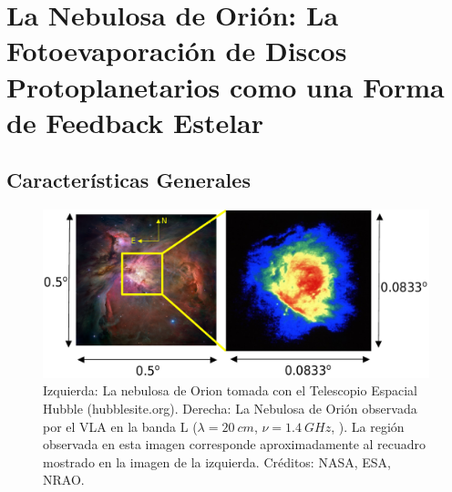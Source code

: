 \chapter[La Nebulosa de Orión]{La Nebulosa de Orión: La Fotoevaporación de Discos Protoplanetarios como una Forma de Feedback Estelar}
\thispagestyle{empty}
\label{chap:ONC}
\section{Características Generales}
\begin{figure}
  \centering
    \includegraphics[width=\linewidth]{./Figures/orion-HST-NRAO} 
    \caption[La Nebulosa de Orión]{Izquierda: La nebulosa de Orion tomada con el Telescopio Espacial Hubble (hubblesite.org). Derecha: La Nebulosa de Orión observada por el VLA en la banda L ($\lambda = \SI{20}{cm}$, $\nu = \SI{1.4}{GHz}$, \citet{Yusef:1990}). La región observada en esta imagen corresponde aproximadamente al recuadro mostrado en la imagen de la izquierda. Créditos: NASA, ESA, NRAO.}
    \label{fig:orion-pretty}
\end{figure}

